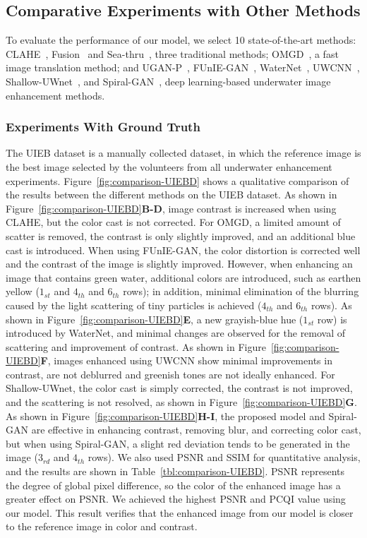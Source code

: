 \documentclass[utf8]{FrontiersinHarvard} %
\begin{document}
\subsection{Comparative Experiments with Other Methods}
To evaluate the performance of our model, we select 10 state-of-the-art methods: CLAHE~\citep{109340}, Fusion~\citep{2012Enhancing} and Sea-thru~\citep{akkaynak2019sea}, three traditional methods;  OMGD~\citep{ren2021online}, a fast image translation method; and UGAN-P~\citep{8460552}, FUnIE-GAN~\citep{9001231}, WaterNet~\citep{8917818}, UWCNN~\citep{2019Underwater1}, Shallow-UWnet~\citep{naik2021shallow}, and Spiral-GAN~\citep{2020Underwater}, deep learning-based underwater image enhancement methods.

\subsubsection{Experiments With Ground Truth}
The UIEB dataset is a manually collected dataset, in which the reference image is the best image selected by the volunteers from all underwater enhancement experiments. Figure~\ref{fig:comparison-UIEBD} shows a qualitative comparison of the results between the different methods on the UIEB dataset. As shown in Figure~\ref{fig:comparison-UIEBD}\textbf{B-D}, image contrast is increased when using CLAHE, but the color cast is not corrected. For OMGD, a limited amount of scatter is removed, the contrast is only slightly improved, and an additional blue cast is introduced. When using FUnIE-GAN, the color distortion is corrected well and the contrast of the image is slightly improved. However, when enhancing an image that contains green water, additional colors are introduced, such as earthen yellow ($1_{st}$ and $4_{th}$ and $6_{th}$ rows); in addition, minimal elimination of the blurring caused by the light scattering of tiny particles is achieved ($4_{th}$ and $6_{th}$ rows). As shown in Figure~\ref{fig:comparison-UIEBD}\textbf{E}, a new grayish-blue hue ($1_{st}$ row) is introduced by WaterNet, and minimal changes are observed for the removal of scattering and improvement of 
contrast. As shown in Figure~\ref{fig:comparison-UIEBD}\textbf{F}, images enhanced using UWCNN show minimal improvements in contrast, are not deblurred and greenish tones are not ideally enhanced.  For Shallow-UWnet, the color cast is simply corrected, the contrast is not improved, and the scattering is not resolved, as shown in Figure~\ref{fig:comparison-UIEBD}\textbf{G}. As shown in Figure~\ref{fig:comparison-UIEBD}\textbf{H-I}, the proposed model and Spiral-GAN are effective in enhancing contrast, removing blur, and correcting color cast, but when using Spiral-GAN, a slight red deviation tends to be generated in the image ($3_{rd}$ and $4_{th}$ rows). We also used PSNR and SSIM for quantitative analysis, and the results are shown in Table~\ref{tbl:comparison-UIEBD}. PSNR represents the degree of global pixel difference, so the color of the enhanced image has a greater effect on PSNR. {We achieved the highest PSNR and PCQI value using our model. This result verifies that the enhanced image from our model is closer to the reference image in color and contrast.}
\end{document}
